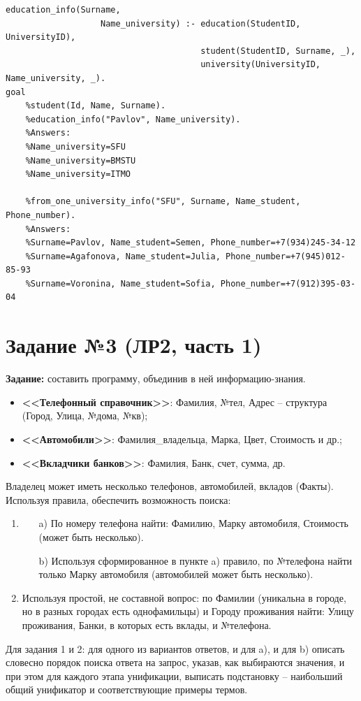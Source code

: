 \begin{lstlisting}[basicstyle=\footnotesize]
	education_info(Surname, 
				   Name_university) :- education(StudentID, UniversityID),
									   student(StudentID, Surname, _),
									   university(UniversityID, Name_university, _).
goal
	%student(Id, Name, Surname).
	%education_info("Pavlov", Name_university).
	%Answers:
	%Name_university=SFU
	%Name_university=BMSTU
	%Name_university=ITMO
	
	%from_one_university_info("SFU", Surname, Name_student, Phone_number).
	%Answers:
	%Surname=Pavlov, Name_student=Semen, Phone_number=+7(934)245-34-12
	%Surname=Agafonova, Name_student=Julia, Phone_number=+7(945)012-85-93
	%Surname=Voronina, Name_student=Sofia, Phone_number=+7(912)395-03-04
\end{lstlisting}

\chapter{Задание №3 (ЛР2, часть 1)}
\textbf{Задание:} составить программу, объединив в ней информацию-знания.
\begin{itemize}
	\item \textbf{<<Телефонный справочник>>}: Фамилия, №тел, Адрес -- структура (Город, Улица, №дома, №кв);
	\item \textbf{<<Автомобили>>}: Фамилия\_владельца, Марка, Цвет, Стоимость и др.;
	\item \textbf{<<Вкладчики банков>>}: Фамилия, Банк, счет, сумма, др.
\end{itemize}
Владелец может иметь несколько телефонов, автомобилей, вкладов (Факты).
Используя правила, обеспечить возможность поиска:
\begin{enumerate}
	\item 
	\begin{itemize}
		\item[a)] По номеру телефона найти: Фамилию, Марку автомобиля, Стоимость (может быть несколько).
		\item[b)] Используя сформированное в пункте a) правило, по №телефона найти только Марку автомобиля (автомобилей может быть несколько).
	\end{itemize}
	\item Используя простой, не составной вопрос: по Фамилии (уникальна в городе, но в разных городах есть однофамильцы) и Городу проживания найти: Улицу проживания, Банки, в которых есть вклады, и №телефона. 
\end{enumerate}
Для задания 1 и 2: для одного из вариантов ответов, и для a), и для b) описать словесно порядок поиска ответа на запрос, указав, как выбираются значения, и при этом для каждого этапа унификации, выписать подстановку -- наибольший общий унификатор и соответствующие примеры термов.
